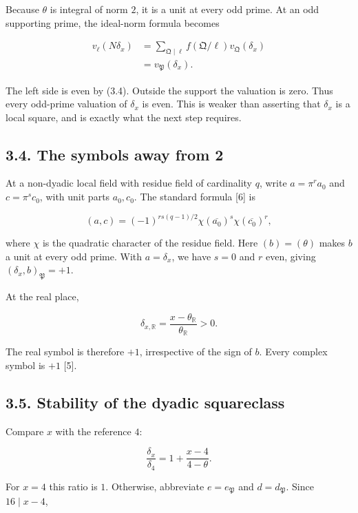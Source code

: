 \documentclass[11pt,a4paper]{article}
\begin{document}
Because \(\theta\) is integral of norm \(2\), it is a unit at every odd
prime. At an odd supporting prime, the ideal-norm formula becomes

\[
\begin{aligned}
v_\ell(N\delta_x)
&=\sum_{\mathfrak Q\mid\ell}
 f(\mathfrak Q/\ell)v_{\mathfrak Q}(\delta_x)\\
&=v_{\mathfrak P}(\delta_x).
\end{aligned}
\tag{3.6}
\]

The left side is even by (3.4). Outside the support the valuation is
zero. Thus every odd-prime valuation of \(\delta_x\) is even. This is
weaker than asserting that \(\delta_x\) is a local square, and is
exactly what the next step requires.

\subsection{3.4. The symbols away from 2}\label{neutrality}

At a non-dyadic local field with residue field of cardinality \(q\),
write \(a=\pi^r a_0\) and \(c=\pi^s c_0\), with unit parts \(a_0,c_0\).
The standard formula {[}6{]} is

\[
(a,c)=(-1)^{rs(q-1)/2}
\chi(\overline{a_0})^s\chi(\overline{c_0})^r,
\tag{3.7}
\]

where \(\chi\) is the quadratic character of the residue field. Here
\((b)=(\theta)\) makes \(b\) a unit at every odd prime. With
\(a=\delta_x\), we have \(s=0\) and \(r\) even, giving
\((\delta_x,b)_{\mathfrak P}=+1\).

At the real place,

\[
\delta_{x,\mathbb R}
=\frac{x-\theta_{\mathbb R}}{\theta_{\mathbb R}}>0.
\]

The real symbol is therefore \(+1\), irrespective of the sign of \(b\).
Every complex symbol is \(+1\) {[}5{]}.

\subsection{3.5. Stability of the dyadic squareclass}\label{hensel}

Compare \(x\) with the reference \(4\):

\[
\frac{\delta_x}{\delta_4}
=1+\frac{x-4}{4-\theta}.
\tag{3.8}
\]

For \(x=4\) this ratio is \(1\). Otherwise, abbreviate
\(e=e_{\mathfrak P}\) and \(d=d_{\mathfrak P}\). Since \(16\mid x-4\),
\end{document}
